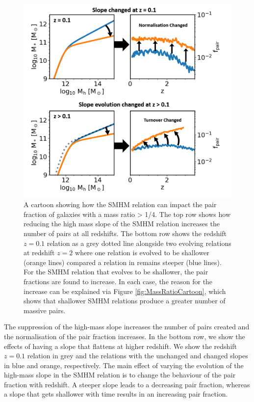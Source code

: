 \begin{figure}[h]
    \centering
    \includegraphics[width = \linewidth]{Figures/Chapter5/SMHM_PF_Cartoon.png}
    \caption{A cartoon showing how the SMHM relation can impact the pair fraction of galaxies with a mass ratio > 1/4. The top row shows how reducing the high mass slope of the SMHM relation increases the number of pairs at all redshifts. The bottom row shows the redshift $z=0.1$ relation as a grey dotted line alongside two evolving relations at redshift $z=2$ where one relation is evolved to be shallower (orange lines) compared a relation in remains steeper (blue lines). For the SMHM relation that evolves to be shallower, the pair fractions are found to increase. In each case, the reason for the increase can be explained via Figure \ref{fig:MassRatioCartoon}, which shows that shallower SMHM relations produce a greater number of massive pairs. }
    \label{fig:SMHM_PF_Cartoon}
\end{figure}

The suppression of the high-mass slope increases the number of pairs created and the normalisation of the pair fraction increases. 
In the bottom row, we show the effects of having a slope that flattens at higher redshift. 
We show the redshift $z=0.1$ relation in grey and the relations with the unchanged and changed slopes in blue and orange, respectively. 
The main effect of varying the evolution of the high-mass slope in the SMHM relation is to change the behaviour of the pair fraction with redshift. 
A steeper slope leads to a decreasing pair fraction, whereas a slope that gets shallower with time results in an increasing pair fraction.

